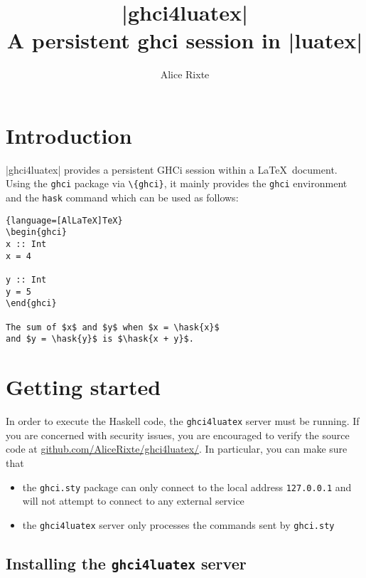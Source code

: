 \documentclass{article}
\title{|ghci4luatex| \\ \vspace{0.4em}
  \large A persistent ghci session in |luatex|}
\author{Alice Rixte}
\begin{document}
\maketitle
\tableofcontents

\newpage

\section{Introduction}


|ghci4luatex| provides a persistent GHCi session within a \LaTeX\ document. Using the \texttt{ghci} package via \texttt{\textbackslash {}\{ghci\}}, it mainly provides the \texttt{ghci} environment and the \texttt{hask} command which can be used as follows:

\begin{latexbox}
  \begin{lstlisting}{language=[AlLaTeX]TeX}
\begin{ghci}
x :: Int
x = 4

y :: Int
y = 5
\end{ghci}

The sum of $x$ and $y$ when $x = \hask{x}$
and $y = \hask{y}$ is $\hask{x + y}$.

\end{lstlisting}
\end{latexbox}

\section{Getting started}

In order to execute the Haskell code, the \texttt{ghci4luatex} server must be running. If you are concerned with security issues, you are encouraged to verify the source code at \href{https://github.com/AliceRixte/ghci4luatex/}{github.com/AliceRixte/ghci4luatex/}. In particular, you can make sure that

\begin{itemize}
  \item  the \texttt{ghci.sty} package can only connect to the local address \texttt{127.0.0.1} and will not attempt to connect to any external service
  \item the \texttt{ghci4luatex} server only processes the commands sent by \texttt{ghci.sty}
\end{itemize}

\subsection{Installing the \texttt{ghci4luatex} server}
\end{document}
